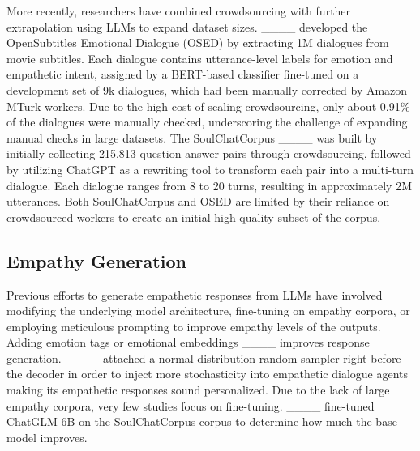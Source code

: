More recently, researchers have combined crowdsourcing with further extrapolation using LLMs to expand dataset sizes.
____ developed the OpenSubtitles Emotional Dialogue (OSED) by extracting 1M dialogues from movie subtitles. Each dialogue contains utterance-level labels for emotion and empathetic intent, assigned by a BERT-based classifier fine-tuned on a development set of 9k dialogues, which had been manually corrected by Amazon MTurk workers. Due to the high cost of scaling crowdsourcing, only about 0.91\% of the dialogues were manually checked, underscoring the challenge of expanding manual checks in large datasets.
The SoulChatCorpus ____ was built by initially collecting 215,813 question-answer pairs through crowdsourcing, followed by utilizing ChatGPT as a rewriting tool to transform each pair into a multi-turn dialogue. Each dialogue ranges from 8 to 20 turns, resulting in approximately 2M utterances. Both SoulChatCorpus and OSED are limited by their reliance on crowdsourced workers to create an initial high-quality subset of the corpus.

\subsection{Empathy Generation}

Previous efforts to generate empathetic responses from LLMs have involved modifying the underlying model architecture, fine-tuning on empathy corpora, or employing meticulous prompting to improve empathy levels of the outputs.
Adding emotion tags or emotional embeddings
____ improves response generation. 
____ attached a normal distribution random sampler right before the decoder in order to inject more stochasticity into empathetic dialogue agents making its empathetic responses sound personalized. Due to the lack of large empathy corpora, very few studies focus on fine-tuning. ____ fine-tuned ChatGLM-6B on the SoulChatCorpus corpus to determine how much the base model improves. 

